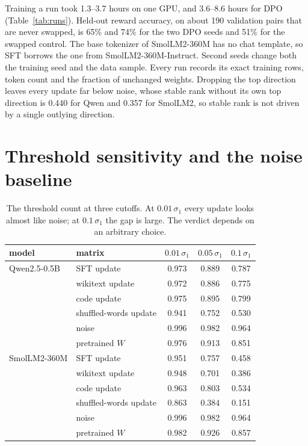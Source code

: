 Training a run took 1.3--3.7 hours on one GPU, and 3.6--8.6 hours for DPO
(Table~\ref{tab:runs}). Held-out reward accuracy, on about 190 validation
pairs that are never swapped, is 65\% and 74\% for the two DPO seeds and 51\%
for the swapped control. The base
tokenizer of SmolLM2-360M has no chat template, so SFT borrows the one from
SmolLM2-360M-Instruct. Second seeds change both the training seed and the data
sample. Every run records its exact training rows, token count and the
fraction of unchanged weights. Dropping the top direction leaves every update
far below noise, whose stable rank without its own top direction is 0.440 for
Qwen and 0.357 for SmolLM2, so stable rank is not driven by a single outlying
direction.

\section{Threshold sensitivity and the noise baseline}
\label{app:sensitivity}

\begin{table}[H]
\caption{The threshold count at three cutoffs. At $0.01\,\sigma_1$ every
update looks almost like noise; at $0.1\,\sigma_1$ the gap is large. The verdict
depends on an arbitrary choice.}
\label{tab:threshold}
\begin{center}
\small
\begin{tabular}{llccc}
\toprule
model & matrix & $0.01\,\sigma_1$ & $0.05\,\sigma_1$ & $0.1\,\sigma_1$ \\
\midrule
Qwen2.5-0.5B & SFT update            & 0.973 & 0.889 & 0.787 \\
             & wikitext update       & 0.972 & 0.886 & 0.775 \\
             & code update           & 0.975 & 0.895 & 0.799 \\
             & shuffled-words update & 0.941 & 0.752 & 0.530 \\
             & noise                 & 0.996 & 0.982 & 0.964 \\
             & pretrained $W$        & 0.976 & 0.913 & 0.851 \\
\midrule
SmolLM2-360M & SFT update            & 0.951 & 0.757 & 0.458 \\
             & wikitext update       & 0.948 & 0.701 & 0.386 \\
             & code update           & 0.963 & 0.803 & 0.534 \\
             & shuffled-words update & 0.863 & 0.384 & 0.151 \\
             & noise                 & 0.996 & 0.982 & 0.964 \\
             & pretrained $W$        & 0.982 & 0.926 & 0.857 \\
\bottomrule
\end{tabular}
\end{center}
\end{table}

